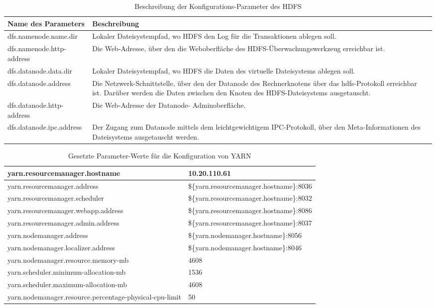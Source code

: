 \begin{table}
	\begin{tabularx}{\textwidth}{|X|X|} \hline
		Name des Parameters & Beschreibung \\ \hline
		dfs.namenode.name.dir & Lokaler Dateisystempfad, wo
		HDFS den Log für die Transaktionen ablegen soll. \\ \hline
		dfs.namenode.http-address & Die Web-Adresse, über den die
		Weboberfläche des HDFS-Überwachungswerkzeug erreichbar ist. \\ \hline
		dfs.datanode.data.dir & Lokaler Dateisystempfad, wo HDFS
		die Daten des virtuelle Dateisystems ablegen soll. \\ \hline
		dfs.datanode.address & Die Netzwerk-Schnittstelle, über den 
		der Datanode des Rechnerknotens über das hdfs-Protokoll erreichbar ist. Darüber 
		werden die Daten zwischen den Knoten des HDFS-Dateisystems ausgetauscht. \\ \hline
		dfs.datanode.http-address & Die Web-Adresse der Datanode-
		Adminoberfläche. \\ \hline
		dfs.datanode.ipc.address & Der Zugang zum Datanode mittels dem
		leichtgewichtigem IPC-Protokoll, über den Meta-Informationen des Dateisystems 
		ausgetauscht werden. \\ \hline
	\end{tabularx}
	\caption{Beschreibung der Konfigurations-Parameter des HDFS}
	\label{config:hdfsDescription}
\end{table}

\begin{table}
	\begin{tabularx}{\textwidth}{| X | X |} \hline
	yarn.resourcemanager.hostname & 10.20.110.61 \\ \hline
	yarn.resourcemanager.address & \$\{yarn.resourcemanager.hostname\}:8036 \\ \hline
	yarn.resourcemanager.scheduler & \$\{yarn.resourcemanager.hostname\}:8032 \\ \hline
	yarn.resourcemanager.webapp.address & \$\{yarn.resourcemanager.hostname\}:8086 \\ \hline
	yarn.resourcemanager.admin.address & \$\{yarn.resourcemanager.hostname\}:8037 \\ \hline
	yarn.nodemanager.address & \$\{yarn.nodemanager.hostname\}:8056 \\ \hline
	yarn.nodemanager.localizer.address & \$\{yarn.nodemanager.hostname\}:8046 \\ \hline
	yarn.nodemanager.resource.memory-mb & 4608 \\ \hline
	yarn.scheduler.minimum-allocation-mb & 1536 \\ \hline
	yarn.scheduler.maximum-allocation-mb & 4608 \\ \hline
	yarn.nodemanager.resource.percentage-physical-cpu-limit & 50 \\ \hline
	\end{tabularx}
	\caption{Gesetzte Parameter-Werte für die Konfiguration von YARN}
	\label{config:yarnValues}
\end{table}

